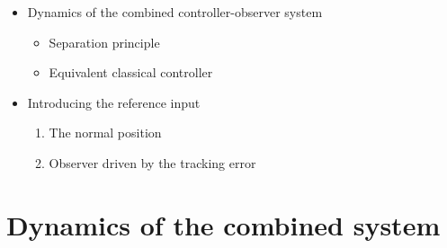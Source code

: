 \def\FileDate{10/04/02}
\def\FileVersion{1.0}


\ifslidesonly
\begin{slide}
   
\end{slide}
\fi

\ifslidesonly
\begin{slide}
   \begin{itemize}
   	\item Dynamics of the combined controller-observer system
\begin{itemize}
	\item Separation principle
	\item Equivalent classical controller
\end{itemize}
\item Introducing the reference input
\begin{enumerate}
	\item The normal position
	\item Observer driven by the tracking error
\end{enumerate}
   \end{itemize}
\end{slide}
\fi

\section*{Dynamics of the combined system} %
\label{sub:dynamics_of_the_combined_system}


\ifslidesonly
\begin{slide}
   
\end{slide}
\fi


\ifslidesonly
\begin{slide}
   
\end{slide}
\fi 





\ifslidesonly
\begin{slide}
   
\end{slide}
\fi

